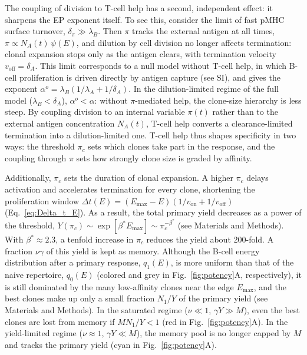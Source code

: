 \documentclass[aps, pre, twocolumn, 10pt, groupedaddress, superscriptaddress, linenumbers]{revtex4-2}
\newcommand{\on}{\text{on}}
\newcommand{\off}{\text{off}}
\newcommand{\DG}{E}
\begin{document}
{The coupling of division to T-cell help has a second, independent effect: it sharpens the EP exponent itself. 
To see this, consider the limit of fast pMHC surface turnover, $\delta_\pi \gg \lambda_B$. 
Then $\pi$ tracks the external antigen at all times, $\pi \propto N_A(t)\,\psi(E)$, and dilution by cell division no longer affects termination: clonal expansion stops only as the antigen clears, with termination velocity $v_\text{off} = \delta_A$. 
This limit corresponds to a null model without T-cell help, in which B-cell proliferation is driven directly by antigen capture (see SI), and gives the exponent $\alpha^o = \lambda_B (1/\lambda_A + 1/\delta_A)$. In the dilution-limited regime of the full model ($\lambda_B < \delta_A$), $\alpha^o < \alpha$: without $\pi$-mediated help, the clone-size hierarchy is less steep. 
By coupling division to an internal variable $\pi(t)$ rather than to the external antigen concentration $N_A(t)$, T-cell help converts a clearance-limited termination into a dilution-limited one. T-cell help thus shapes specificity in two ways: the threshold $\pi_c$ sets which clones take part in the response, and the coupling through $\pi$ sets how strongly clone size is graded by affinity.

Additionally, $\pi_c$ sets the duration of clonal expansion.
A higher $\pi_c$ delays activation and accelerates termination for every clone, shortening the proliferation window $\Delta t(\DG) = (\DG_{\max}-\DG)(1/v_\on + 1/v_\off)$ (Eq.~\ref{eq:Delta_t_E}).
As a result, the total primary yield decreases as a power of the threshold, $Y(\pi_c) \sim \exp[\beta^*\DG_{\max}] \sim \pi_c^{-\beta^*}$ (see Materials and Methods).
With $\beta^* \approx 2.3$, a tenfold increase in $\pi_c$ reduces the yield about 200-fold.
A fraction $\nu\gamma$ of this yield is kept as memory.
Although the B-cell energy distribution after a primary response, $q_1(\DG)$, is more uniform than that of the naive repertoire, $q_0(\DG)$ (colored and grey in Fig.~\ref{fig:potency}A, respectively), it is still dominated by the many low-affinity clones near the edge $\DG_{\max}$, and the best clones make up only a small fraction $N_1/Y$ of the primary yield (see Materials and Methods).
In the saturated regime ($\nu \ll 1$, $\gamma Y \gg M$), even the best clones are lost from memory if $M N_1/Y < 1$ (red in Fig.~\ref{fig:potency}A).
In the yield-limited regime ($\nu \approx 1$, $\gamma Y \ll M$), the memory pool is no longer capped by $M$ and tracks the primary yield (cyan in Fig.~\ref{fig:potency}A).

}
\end{document}
